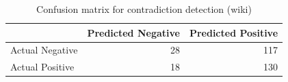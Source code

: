 \begin{table}
\caption{Confusion matrix for contradiction detection (wiki)}
\label{tab:confusion_matrix}
\begin{tabular}{lrr}
\toprule
 & Predicted Negative & Predicted Positive \\
\midrule
Actual Negative & 28 & 117 \\
Actual Positive & 18 & 130 \\
\bottomrule
\end{tabular}
\end{table}
